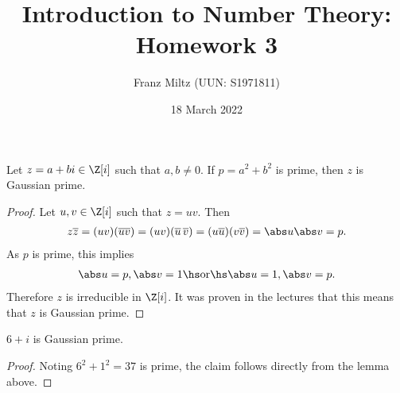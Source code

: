 \documentclass{article}
\begin{document}
\title{Introduction to Number Theory: Homework 3}
\author{Franz Miltz (UUN: S1971811)}
\date{18 March 2022}
\maketitle

\begin{lemma*}
   Let $z=a+bi\in\Z[i]$ such that $a,b\not=0$. If $p=a^2+b^2$ is prime, then $z$ is Gaussian prime.
   \begin{proof}
      Let $u,v\in\Z[i]$ such that $z=uv$. Then
      \begin{align*}
         z\overline z =  (uv)(\overline{uv}) = (u v)(\overline u\,\overline v) = (u\overline u)(v\overline v) = \abs u\abs v = p.
      \end{align*}
      As $p$ is prime, this implies 
      \begin{align*}
         \abs u = p, \abs v = 1 \hs\text{or}\hs\abs u=1,\abs v=p.
      \end{align*} 
      Therefore $z$ is irreducible in $\Z[i]$. It was proven in the lectures that this means that $z$ is Gaussian prime.
   \end{proof}
\end{lemma*}

\begin{claim*}[1]
   $6+i$ is Gaussian prime.
   \begin{proof}
      Noting $6^2+1^2=37$ is prime, the claim follows directly from the lemma above.
   \end{proof}
\end{claim*}
\end{document}
